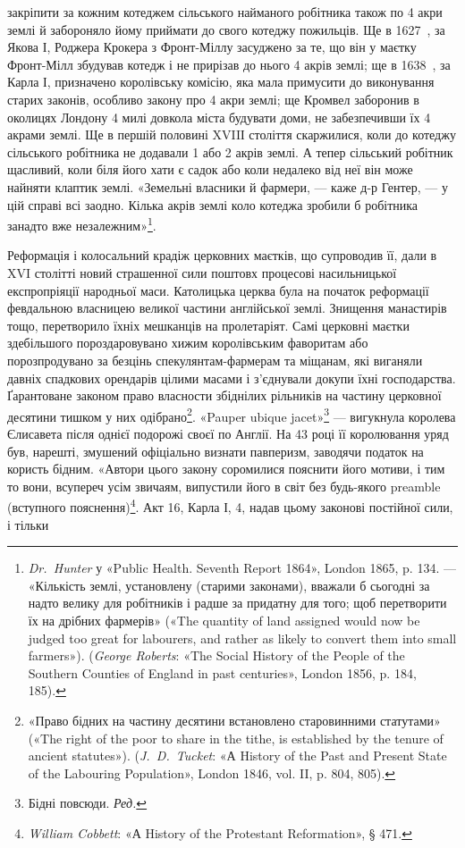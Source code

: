 \parcont{}  %
закріпити за кожним котеджем сільського найманого робітника
також по 4 акри землі й забороняло йому приймати до свого
котеджу пожильців. Ще в 1627~, за Якова І, Роджера Крокера
з Фронт-Міллу засуджено за те, що він у маєтку Фронт-Мілл
збудував котедж і не прирізав до нього 4 акрів землі; ще в 1638~,
за Карла І, призначено королівську комісію, яка мала примусити
до виконування старих законів, особливо закону про 4 акри
землі; ще Кромвел заборонив в околицях Лондону 4 милі довкола
міста будувати доми, не забезпечивши їх 4 акрами землі. Ще в
першій половині XVIIІ століття скаржилися, коли до котеджу
сільського робітника не додавали 1 або 2 акрів землі. А тепер
сільський робітник щасливий, коли біля його хати є садок або
коли недалеко від неї він може найняти клаптик землі. «Земельні
власники й фармери, — каже д-р Гентер, — у цій справі всі заодно.
Кілька акрів землі коло котеджа зробили б робітника
занадто вже незалежним»\footnote{
\emph{Dr.~Hunter} у «Public Health. Seventh Report 1864», London 1865,
p. 134. — «Кількість землі, установлену (старими законами), вважали б
сьогодні за надто велику для робітників і радше за придатну для того;
щоб перетворити їх на дрібних фармерів» («The quantity of land assigned
would now be judged too great for labourers, and rather as likely to
convert them into small farmers»). (\emph{George Roberts}: «The Social History
of the People of the Southern Counties of England in past centuries», London
1856, p. 184, 185).
}.

Реформація і колосальний крадіж церковних маєтків, що
супроводив її, дали в XVI столітті новий страшенної сили поштовх
процесові насильницької експропріяції народньої маси.
Католицька церква була на початок реформації февдальною
власницею великої частини англійської землі. Знищення манастирів
тощо, перетворило їхніх мешканців на пролетаріят.
Самі церковні маєтки здебільшого пороздаровувано хижим королівським
фаворитам або порозпродувано за безцінь спекулянтам-фармерам
та міщанам, які виганяли давніх спадкових орендарів
цілими масами і з’єднували докупи їхні господарства. Ґарантоване
законом право власности збіднілих рільників на частину
церковної десятини тишком у них одібрано\footnote{
«Право бідних на частину десятини встановлено старовинними
статутами» («The right of the poor to share in the tithe, is established by
the tenure of ancient statutes»). (\emph{J.~D.~Tucket}: «А History of the Past
and Present State of the Labouring Population», London 1846, vol. II,
p. 804, 805).
}. «Pauper ubique
jacet»\footnote*{
Бідні повсюди. \emph{Ред.}
} — вигукнула королева Єлисавета після однієї подорожі
своєї по Англії. На 43 році її королювання уряд був, нарешті,
змушений офіціально визнати павперизм, заводячи податок на
користь бідним. «Автори цього закону соромилися пояснити
його мотиви, і тим то вони, всупереч усім звичаям, випустили
його в світ без будь-якого preamble (вступного пояснення)\footnote{
\emph{William Cobbett}: «А History of the Protestant Reformation», § 471.
}.
Акт 16, Карла І, 4, надав цьому законові постійної сили, і тільки
\parbreak{}  %
